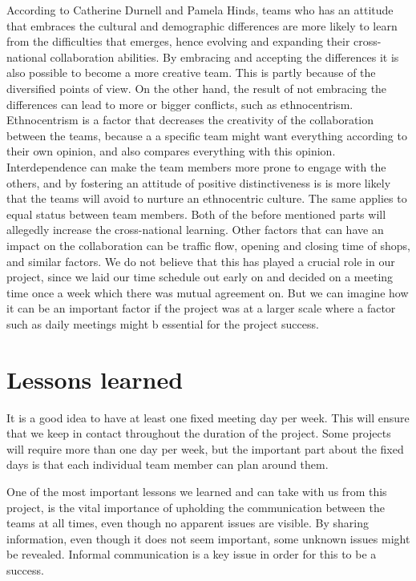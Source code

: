 According to Catherine Durnell and Pamela Hinds, teams who has an attitude that embraces the cultural and demographic differences are more likely to learn from the difficulties that emerges, hence evolving and expanding their cross-national collaboration abilities. By embracing and accepting the differences it is also possible to become a more creative team. This is partly because of the diversified points of view. On the other hand, the result of not embracing the differences can lead to more or bigger conflicts, such as ethnocentrism. Ethnocentrism is a factor that decreases the creativity of the collaboration between the teams, because a a specific team might want everything according to their own opinion, and also compares everything with this opinion.
Interdependence can make the team members more prone to engage with the others, and by fostering an attitude of positive distinctiveness is is more likely that the teams will avoid to nurture an ethnocentric culture. The same applies to equal status between team members. Both of the before mentioned parts will allegedly increase the cross-national learning.
Other factors that can have an impact on the collaboration can be traffic flow, opening and closing time of shops, and similar factors. We do not believe that this has played a crucial role in our project, since we laid our time schedule out early on and decided on a meeting time once a week which there was mutual agreement on. But we can imagine how it can be an important factor if the project was at a larger scale where a factor such as daily meetings might b essential for the project success.


\section{Lessons learned}


It is a good idea to have at least one fixed meeting day per week. This will ensure that we keep in contact throughout the duration of the project. Some projects will require more than one day per week, but the important part about the fixed days is that each individual team member can plan around them.

One of the most important lessons we learned and can take with us from this project, is the vital importance of upholding the communication between the teams at all times, even though no apparent issues are visible. By sharing information, even though it does not seem important, some unknown issues might be revealed. Informal communication is a key issue in order for this to be a success.

